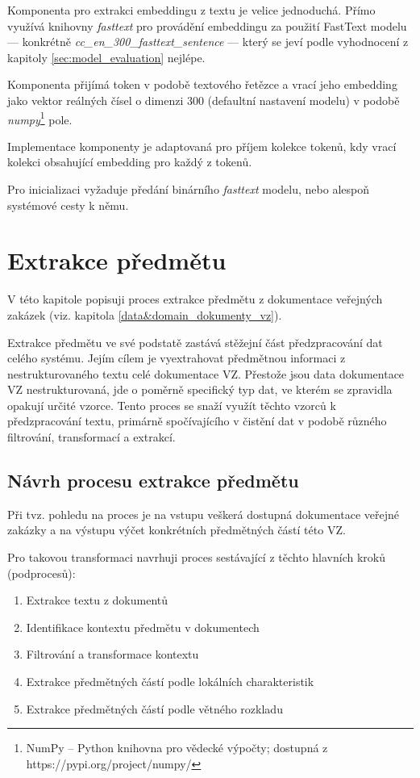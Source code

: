 \documentclass[thesis=M,czech]{FITthesis}[2019/12/23]
\begin{document}
Komponenta pro extrakci embeddingu z textu je velice jednoduchá. Přímo využívá knihovny \textit{fasttext} pro provádění embeddingu za použití FastText modelu --- konkrétně \textit{cc\_en\_300\_fasttext\_sentence} --- který se jeví podle vyhodnocení z kapitoly \ref{sec:model_evaluation} nejlépe.

Komponenta přijímá token v podobě textového řetězce a vrací jeho embedding jako vektor reálných čísel o dimenzi 300 (defaultní nastavení modelu) v podobě \textit{numpy}\footnote{NumPy -- Python knihovna pro vědecké výpočty;\newline
dostupná z https://pypi.org/project/numpy/} pole.

Implementace komponenty je adaptovaná pro příjem kolekce tokenů, kdy vrací kolekci obsahující embedding pro každý z tokenů.

Pro inicializaci vyžaduje předání binárního \textit{fasttext} modelu, nebo alespoň systémové cesty k němu.

\newpage
\section{Extrakce předmětu}
\label{sec:subjextraction}

V této kapitole popisuji proces extrakce předmětu z dokumentace veřejných zakázek (viz. kapitola \ref{data&domain_dokumenty_vz}).

Extrakce předmětu ve své podstatě zastává stěžejní část předzpracování dat celého systému. Jejím cílem je vyextrahovat předmětnou informaci z nestrukturovaného textu celé dokumentace VZ. Přestože jsou data dokumentace VZ nestrukturovaná, jde o poměrně specifický typ dat, ve kterém se zpravidla opakují určité vzorce. Tento proces se snaží využít těchto vzorců k předzpracování textu, primárně spočívajícího v čistění dat v podobě různého filtrování, transformací a extrakcí.

\subsection{Návrh procesu extrakce předmětu}
\label{sec:subj_extraction_design}

Při tvz.  pohledu na proces je na vstupu veškerá dostupná dokumentace veřejné zakázky a na výstupu výčet konkrétních předmětných částí této VZ.

Pro takovou transformaci navrhuji proces sestávající z těchto hlavních kroků (podprocesů):
\begin{enumerate}
    \item Extrakce textu z dokumentů
    \item Identifikace kontextu předmětu v dokumentech
    \item Filtrování a transformace kontextu
    \item Extrakce předmětných částí podle lokálních charakteristik
    \item Extrakce předmětných částí podle větného rozkladu
\end{enumerate}
\end{document}
